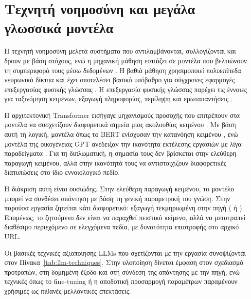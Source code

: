 \section{Τεχνητή νοημοσύνη και μεγάλα γλωσσικά μοντέλα}

Η τεχνητή νοημοσύνη μελετά συστήματα που αντιλαμβάνονται, συλλογίζονται και
δρουν με βάση στόχους, ενώ η μηχανική μάθηση εστιάζει σε μοντέλα που
βελτιώνουν τη συμπεριφορά τους μέσω δεδομένων \cite{russell2021aima,
bishop2006pattern,alpaydin2020ml}. Η βαθιά μάθηση χρησιμοποιεί πολυεπίπεδα
νευρωνικά δίκτυα και έχει αποτελέσει βασικό υπόβαθρο για σύγχρονες εφαρμογές
επεξεργασίας φυσικής γλώσσας \cite{goodfellow2016deep,aggarwal2018neural,
lecun2015deep}. Η επεξεργασία φυσικής γλώσσας παρέχει τις έννοιες για
ταξινόμηση κειμένων, εξαγωγή πληροφορίας, περίληψη και ερωταπαντήσεις
\cite{jurafsky2025slp}.

Η αρχιτεκτονική Transformer εισήγαγε μηχανισμούς προσοχής που επιτρέπουν στα
μοντέλα να συσχετίζουν διαφορετικά σημεία μιας ακολουθίας κειμένου
\cite{vaswani2017attention}. Με βάση αυτή τη λογική, μοντέλα όπως το BERT
ενίσχυσαν την κατανόηση κειμένου \cite{devlin2019bert}, ενώ μοντέλα της
οικογένειας GPT ανέδειξαν την ικανότητα εκτέλεσης εργασιών με λίγα παραδείγματα
\cite{brown2020language}. Για τη διπλωματική, η σημασία τους δεν βρίσκεται στην
ελεύθερη παραγωγή κειμένου, αλλά στην ικανότητά τους να αντιστοιχίζουν
διαφορετικές διατυπώσεις στο ίδιο εννοιολογικό πεδίο.

Η διάκριση αυτή είναι ουσιώδης. Στην ελεύθερη παραγωγή κειμένου, το μοντέλο
μπορεί να συνθέσει απάντηση με βάση τη γενική παραμετρική του γνώση. Στην
παρούσα εργασία ζητείται κάτι διαφορετικό: εξαγωγή τεκμηριωμένη στην πηγή
( ή ). Επομένως, το ζητούμενο δεν είναι να παραχθεί πειστικό
κείμενο, αλλά να μετατραπεί διαθέσιμο περιεχόμενο σε ελεγχόμενα πεδία, με
δυνατότητα επιστροφής στο αρχικό URL.

Οι βασικές τεχνικές αξιοποίησης LLMs που σχετίζονται με την εργασία
συνοψίζονται στον Πίνακα~\ref{tab:llm-techniques}. Στην υλοποίηση δίνεται
έμφαση στον σχεδιασμό προτροπών, στη δομημένη έξοδο και στη σύνδεση της
απάντησης με την πηγή, ενώ τεχνικές όπως το fine-tuning ή η αποδοτική
προσαρμογή παραμέτρων παραμένουν χρήσιμες ως πιθανές μελλοντικές επεκτάσεις.

